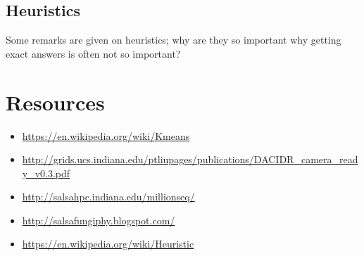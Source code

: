 \subsection{Heuristics}\label{heuristics}

Some remarks are given on heuristics; why are they so important why
getting exact answers is often not so important?


\section{Resources}\label{resources}

\begin{itemize}

\item
  \url{https://en.wikipedia.org/wiki/Kmeans}
\item
  \url{http://grids.ucs.indiana.edu/ptliupages/publications/DACIDR_camera_ready_v0.3.pdf}
\item
  \url{http://salsahpc.indiana.edu/millionseq/}
\item
  \url{http://salsafungiphy.blogspot.com/}
\item
  \url{https://en.wikipedia.org/wiki/Heuristic}
\end{itemize}
